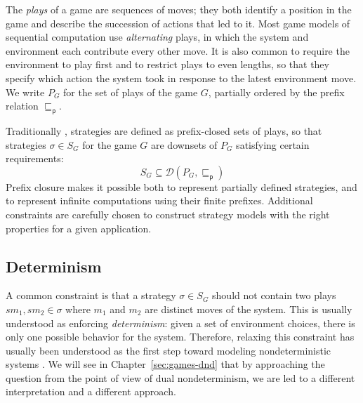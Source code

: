 \documentclass[11pt,oneside,draft]{book}
\theoremstyle{definition}
\newcommand{\kw}[1]{\ensuremath{ \mathsf{#1} }}
\newcommand{\pref}{\sqsubseteq_\kw{p}}  %
\begin{document}
The \emph{plays} of a game are sequences of moves;
they both identify a position in the game
and describe the succession of actions that led to it.
Most game models of sequential computation
use \emph{alternating} plays,
in which
the system and environment each contribute
every other move.
It is also common to require the environment to play first
and to restrict plays to even lengths,
so that they specify which action the system took
in response to the latest environment move.
We write $P_G$ for the set of plays of the game $G$,
partially ordered by the prefix relation $\pref$.

Traditionally \citep{gamesem99},
strategies are defined as
prefix-closed sets of plays,
so that strategies $\sigma \in S_G$
for the game $G$ are downsets of $P_G$
satisfying certain requirements:
\[
    S_G \subseteq
    \mathcal{D}(P_G, {\pref})
\]
Prefix closure makes it possible both
to represent partially defined strategies,
and to represent infinite computations
using their finite prefixes.
Additional constraints
are carefully chosen to construct
strategy models
with the right properties
for a given application.

\subsection{Determinism}

A common constraint is that a strategy $\sigma \in S_G$
should not contain two plays $s m_1, s m_2 \in \sigma$
where $m_1$ and $m_2$ are distinct moves of the system.
This is usually understood as
enforcing \emph{determinism}:
given a set of environment choices,
there is only one possible behavior for the system.
Therefore,
relaxing this constraint has usually been understood
as the first step toward modeling nondeterministic systems
\citep{gsfnd}.
We will see in Chapter~\ref{sec:games-dnd}
that by approaching the question
from the point of view of dual nondeterminism,
we are led to a different interpretation and a different approach.

%
\end{document}
